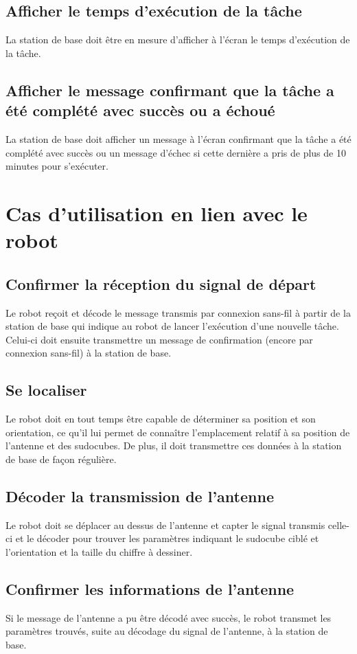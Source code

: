 \subsection{Afficher le temps d'exécution de la tâche}
La station de base doit être en mesure d'afficher à l'écran le temps d'exécution de la tâche.
\subsection{Afficher le message confirmant que la tâche a été complété avec succès ou a échoué}
La station de base doit afficher un message à l'écran confirmant que la tâche a été complété avec succès ou un message d'échec si cette dernière a pris de plus de 10 minutes pour s'exécuter.
\section{Cas d'utilisation en lien avec le robot}
\subsection{Confirmer la réception du signal de départ}
Le robot reçoit et décode le message transmis par connexion sans-fil à partir de la station de base qui indique au robot de lancer l'exécution d'une nouvelle tâche. Celui-ci doit ensuite transmettre un message de confirmation (encore par connexion sans-fil) à la station de base.
\subsection{Se localiser}
Le robot doit en tout temps être capable de déterminer sa position et son orientation, ce qu'il lui permet de connaître l'emplacement relatif à sa position de l'antenne et des sudocubes. De plus, il doit transmettre ces données à la station de base de façon régulière.
\subsection{Décoder la transmission de l'antenne}
Le robot doit se déplacer au dessus de l'antenne et capter le signal transmis celle-ci et le décoder pour trouver les paramètres indiquant le sudocube ciblé et l'orientation et la taille du chiffre à dessiner. 
\subsection{Confirmer les informations de l'antenne}
Si le message de l'antenne a pu être décodé avec succès, le robot transmet les paramètres trouvés, suite au décodage du signal de l'antenne, à la station de base.
